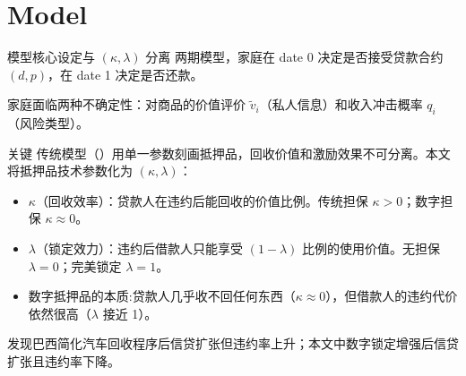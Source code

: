 \section{Model}

\begin{frame}[allowframebreaks]{模型核心设定与 $(\kappa, \lambda)$ 分离}
两期模型，家庭在 date 0 决定是否接受贷款合约 $(d, p)$，在 date 1 决定是否还款。

\medskip
家庭面临两种不确定性：对商品的价值评价 $\tilde{v}_i$（私人信息）和收入冲击概率 $q_i$（风险类型）。
  
\medskip

\begin{block}{关键}
  传统模型（\textcite{kiyotaki1997credit}）用单一参数刻画抵押品，回收价值和激励效果不可分离。本文将抵押品技术参数化为 $(\kappa, \lambda)$：
  \begin{itemize}
    \item $\kappa$（回收效率）：贷款人在违约后能回收的价值比例。传统担保 $\kappa > 0$；数字担保 $\kappa \approx 0$。
    \item $\lambda$（锁定效力）：违约后借款人只能享受 $(1-\lambda)$ 比例的使用价值。无担保 $\lambda = 0$；完美锁定 $\lambda = 1$。
    \item \colorbox{yellow!40}{数字抵押品的本质:}贷款人几乎收不回任何东西（$\kappa \approx 0$），但借款人的违约代价依然很高（$\lambda$ 接近 1）。
  \end{itemize}
  \end{block}

  

  \textcite{assuncao2014repossession} 发现巴西简化汽车回收程序后信贷扩张但违约率上升；本文中数字锁定增强后信贷扩张且违约率下降。
\end{frame}

